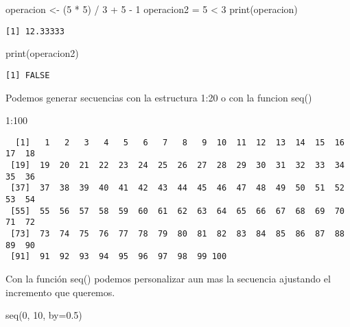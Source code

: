 \documentclass[
  letterpaper,
  DIV=11,
  numbers=noendperiod]{scrartcl}
\newenvironment{Shaded}{\begin{snugshade}}{\end{snugshade}}
\newcommand{\AttributeTok}[1]{\textcolor[rgb]{0.40,0.45,0.13}{#1}}
\newcommand{\DecValTok}[1]{\textcolor[rgb]{0.68,0.00,0.00}{#1}}
\newcommand{\FloatTok}[1]{\textcolor[rgb]{0.68,0.00,0.00}{#1}}
\newcommand{\FunctionTok}[1]{\textcolor[rgb]{0.28,0.35,0.67}{#1}}
\newcommand{\NormalTok}[1]{\textcolor[rgb]{0.00,0.23,0.31}{#1}}
\newcommand{\OtherTok}[1]{\textcolor[rgb]{0.00,0.23,0.31}{#1}}
\newcommand{\SpecialCharTok}[1]{\textcolor[rgb]{0.37,0.37,0.37}{#1}}
\begin{document}
\begin{Shaded}
\begin{Highlighting}[]
\NormalTok{operacion }\OtherTok{\textless{}{-}}\NormalTok{ (}\DecValTok{5} \SpecialCharTok{*} \DecValTok{5}\NormalTok{) }\SpecialCharTok{/} \DecValTok{3} \SpecialCharTok{+} \DecValTok{5} \SpecialCharTok{{-}} \DecValTok{1}
\NormalTok{operacion2 }\OtherTok{=} \DecValTok{5} \SpecialCharTok{\textless{}} \DecValTok{3}
\FunctionTok{print}\NormalTok{(operacion)}
\end{Highlighting}
\end{Shaded}

\begin{verbatim}
[1] 12.33333
\end{verbatim}

\begin{Shaded}
\begin{Highlighting}[]
\FunctionTok{print}\NormalTok{(operacion2)}
\end{Highlighting}
\end{Shaded}

\begin{verbatim}
[1] FALSE
\end{verbatim}

Podemos generar secuencias con la estructura 1:20 o con la funcion seq()

\begin{Shaded}
\begin{Highlighting}[]
\DecValTok{1}\SpecialCharTok{:}\DecValTok{100}
\end{Highlighting}
\end{Shaded}

\begin{verbatim}
  [1]   1   2   3   4   5   6   7   8   9  10  11  12  13  14  15  16  17  18
 [19]  19  20  21  22  23  24  25  26  27  28  29  30  31  32  33  34  35  36
 [37]  37  38  39  40  41  42  43  44  45  46  47  48  49  50  51  52  53  54
 [55]  55  56  57  58  59  60  61  62  63  64  65  66  67  68  69  70  71  72
 [73]  73  74  75  76  77  78  79  80  81  82  83  84  85  86  87  88  89  90
 [91]  91  92  93  94  95  96  97  98  99 100
\end{verbatim}

Con la función seq() podemos personalizar aun mas la secuencia ajustando
el incremento que queremos.

\begin{Shaded}
\begin{Highlighting}[]
\FunctionTok{seq}\NormalTok{(}\DecValTok{0}\NormalTok{, }\DecValTok{10}\NormalTok{, }\AttributeTok{by=}\FloatTok{0.5}\NormalTok{)}
\end{Highlighting}
\end{Shaded}
\end{document}
